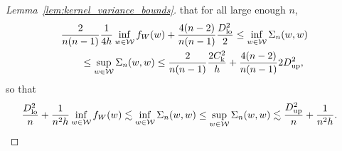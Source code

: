 \documentclass[11pt,lof]{puthesis}
\newcommand{\rk}{\ensuremath{\mathrm{k}}}
\newcommand{\cW}{\ensuremath{\mathcal{W}}}
\newcommand{\Dl}{\ensuremath{D_{\textup{lo}}}}
\newcommand{\Du}{\ensuremath{D_{\textup{up}}}}
\theoremstyle{break}
\theoremstyle{proof}
\newtheorem{proof}{Proof}
\begin{document}
\begin{proof}[Lemma~\ref{lem:kernel_variance_bounds}]
  that for all large enough $n$,
  \begin{align*}
    &\frac{2}{n(n-1)}
    \frac{1}{4h}
    \inf_{w \in \cW} f_W(w)
    + \frac{4(n-2)}{n(n-1)}
    \frac{\Dl^2}{2}
    \leq
    \inf_{w \in \cW} \Sigma_n(w,w) \\
    &\qquad\leq
    \sup_{w \in \cW} \Sigma_n(w,w)
    \leq
    \frac{2}{n(n-1)}
    \frac{2 C_\rk^2}{h}
    + \frac{4(n-2)}{n(n-1)}
    2 \Du^2,
  \end{align*}
  so that
  \begin{align*}
    \frac{\Dl^2}{n}
    + \frac{1}{n^2h}
    \inf_{w \in \cW} f_W(w)
    &\lesssim
    \inf_{w \in \cW} \Sigma_n(w,w)
    \leq
    \sup_{w \in \cW} \Sigma_n(w,w)
    \lesssim
    \frac{\Du^2}{n}
    + \frac{1}{n^2h}.
  \end{align*}
\end{proof}
\end{document}
